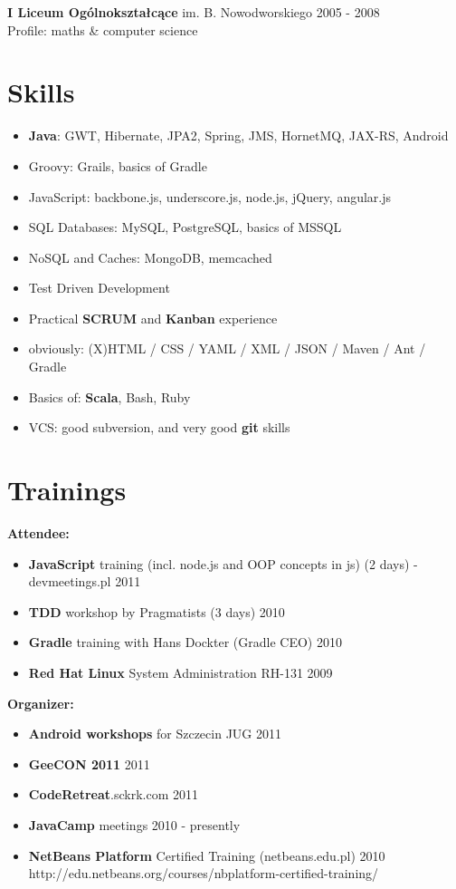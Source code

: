 \documentclass{res}
\begin{document}
\begin{resume}
{\bf I Liceum Ogólnokształcące} im. B. Nowodworskiego \hfill 2005 - 2008\\
	Profile: maths \& computer science

\section{Skills}
\begin{itemize}
 \item \textbf{Java}: GWT, Hibernate, JPA2, Spring, JMS, HornetMQ, JAX-RS, Android
 \item Groovy: Grails, basics of Gradle
 \item JavaScript: backbone.js, underscore.js, node.js, jQuery, angular.js
 \item SQL Databases: MySQL, PostgreSQL, basics of MSSQL
 \item NoSQL and Caches: MongoDB, memcached
 \item Test Driven Development
 \item Practical \textbf{SCRUM} and \textbf{Kanban} experience
 \item obviously: (X)HTML / CSS / YAML / XML / JSON / Maven / Ant / Gradle
 \item Basics of: \textbf{Scala}, Bash, Ruby
 \item VCS: good subversion, and very good \textbf{git} skills
\end{itemize}

\section{Trainings} 
{\bf Attendee:}
\begin{itemize}
 \item \textbf{JavaScript} training (incl. node.js and OOP concepts in js) (2 days) - devmeetings.pl \hfill 2011
 \item \textbf{TDD} workshop by Pragmatists (3 days) \hfill 2010
 \item \textbf{Gradle} training with Hans Dockter (Gradle CEO) \hfill 2010
 \item \textbf{Red Hat Linux} System Administration RH-131 \hfill 2009
\end{itemize}
{\bf Organizer:}
\begin{itemize}
 \item \textbf{Android workshops} for Szczecin JUG \hfill 2011
 \item \textbf{GeeCON 2011} \hfill 2011
 \item \textbf{CodeRetreat}.sckrk.com \hfill 2011
 \item \textbf{JavaCamp} meetings \hfill 2010 - presently
 \item \textbf{NetBeans Platform} Certified Training (netbeans.edu.pl) \hfill 2010 \\
	http://edu.netbeans.org/courses/nbplatform-certified-training/ 
\end{itemize}


\end{resume}
\end{document}
